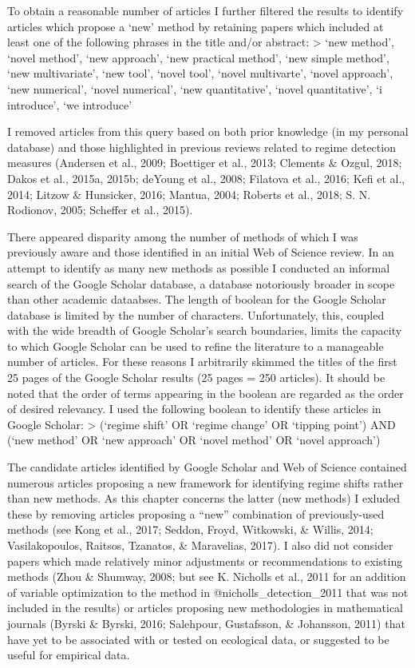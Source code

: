 \documentclass[12pt,twoside,openany]{reedthesis}
\begin{document}
To obtain a reasonable number of articles I further filtered the results to identify articles which propose a `new' method by retaining papers which included at least one of the following phrases in the title and/or abstract:
\textgreater{} `new method', `novel method', `new approach', `new practical method', `new simple method', `new multivariate', `new tool', `novel tool', `novel multivarte', `novel approach', `new numerical', `novel numerical', `new quantitative', `novel quantitative', `i introduce', `we introduce'

I removed articles from this query based on both prior knowledge (in my personal database) and those highlighted in previous reviews related to regime detection measures (Andersen et al., 2009; Boettiger et al., 2013; Clements \& Ozgul, 2018; Dakos et al., 2015a, 2015b; deYoung et al., 2008; Filatova et al., 2016; Kefi et al., 2014; Litzow \& Hunsicker, 2016; Mantua, 2004; Roberts et al., 2018; S. N. Rodionov, 2005; Scheffer et al., 2015).

There appeared disparity among the number of methods of which I was previously aware and those identified in an initial Web of Science review. In an attempt to identify as many new methods as possible I conducted an informal search of the Google Scholar database, a database notoriously broader in scope than other academic dataabses. The length of boolean for the Google Scholar database is limited by the number of characters. Unfortunately, this, coupled with the wide breadth of Google Scholar's search boundaries, limits the capacity to which Google Scholar can be used to refine the literature to a manageable number of articles. For these reasons I arbitrarily skimmed the titles of the first 25 pages of the Google Scholar results (25 pages = 250 articles). It should be noted that the order of terms appearing in the boolean are regarded as the order of desired relevancy. I used the following boolean to identify these articles in Google Scholar:
\textgreater{} (`regime shift' OR `regime change' OR `tipping point') AND (`new method' OR `new approach' OR `novel method' OR `novel approach')

The candidate articles identified by Google Scholar and Web of Science contained numerous articles proposing a new framework for identifying regime shifts rather than new methods. As this chapter concerns the latter (new methods) I exluded these by removing articles proposing a ``new'' combination of previously-used methods (see Kong et al., 2017; Seddon, Froyd, Witkowski, \& Willis, 2014; Vasilakopoulos, Raitsos, Tzanatos, \& Maravelias, 2017). I also did not consider papers which made relatively minor adjustments or recommendations to existing methods (Zhou \& Shumway, 2008; but see K. Nicholls et al., 2011 for an addition of variable optimization to the method in @nicholls\_detection\_2011 that was not included in the results) or articles proposing new methodologies in mathematical journals (Byrski \& Byrski, 2016; Salehpour, Gustafsson, \& Johansson, 2011) that have yet to be associated with or tested on ecological data, or suggested to be useful for empirical data.
\end{document}
